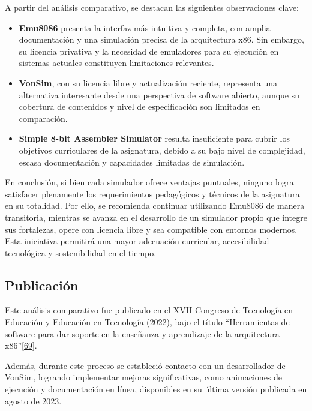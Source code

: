 \documentclass[12pt,oneside]{templates/unerthesis}
\providecommand{\tightlist}{%
  \setlength{\itemsep}{0pt}\setlength{\parskip}{0pt}}
\begin{document}
A partir del análisis comparativo, se destacan las siguientes observaciones clave:

\begin{itemize}
\tightlist
\item
  \textbf{Emu8086} presenta la interfaz más intuitiva y completa, con amplia documentación y una simulación precisa de la arquitectura x86. Sin embargo, su licencia privativa y la necesidad de emuladores para su ejecución en sistemas actuales constituyen limitaciones relevantes.
\item
  \textbf{VonSim}, con su licencia libre y actualización reciente, representa una alternativa interesante desde una perspectiva de software abierto, aunque su cobertura de contenidos y nivel de especificación son limitados en comparación.
\item
  \textbf{Simple 8-bit Assembler Simulator} resulta insuficiente para cubrir los objetivos curriculares de la asignatura, debido a su bajo nivel de complejidad, escasa documentación y capacidades limitadas de simulación.
\end{itemize}

En conclusión, si bien cada simulador ofrece ventajas puntuales, ninguno logra satisfacer plenamente los requerimientos pedagógicos y técnicos de la asignatura en su totalidad. Por ello, se recomienda continuar utilizando Emu8086 de manera transitoria, mientras se avanza en el desarrollo de un simulador propio que integre sus fortalezas, opere con licencia libre y sea compatible con entornos modernos. Esta iniciativa permitirá una mayor adecuación curricular, accesibilidad tecnológica y sostenibilidad en el tiempo.

\hypertarget{publicaciuxf3n}{%
\subsection{Publicación}\label{publicaciuxf3n}}

Este análisis comparativo fue publicado en el XVII Congreso de Tecnología en Educación y Educación en Tecnología (2022), bajo el título ``Herramientas de software para dar soporte en la enseñanza y aprendizaje de la arquitectura x86''\protect\hyperlink{ref-colombani_herramientas_2022}{{[}69{]}}.

Además, durante este proceso se estableció contacto con un desarrollador de VonSim, logrando implementar mejoras significativas, como animaciones de ejecución y documentación en línea, disponibles en su última versión publicada en agosto de 2023.
\end{document}
